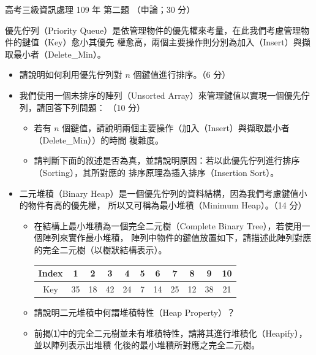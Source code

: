 \begin{pastexam}[label={px:gk3-109-ds-02}]{高考三級資訊處理 109 年 第二題}
（申論；30 分）

優先佇列（Priority Queue）是依管理物件的優先權來考量，在此我們考慮管理物件的鍵值（Key）愈小其優先
權愈高，兩個主要操作則分別為加入（Insert）與擷取最小者（Delete\_Min）。
\begin{itemize}[leftmargin=2em, labelsep=0.3em, itemsep=2pt]
\item[㈠] 請說明如何利用優先佇列對 $n$ 個鍵值進行排序。（6 分）
\item[㈡] 我們使用一個未排序的陣列（Unsorted Array）來管理鍵值以實現一個優先佇列，請回答下列問題：
（10 分）
\begin{itemize}[leftmargin=2em, labelsep=0.3em, itemsep=1pt]
\item[⑴] 若有 $n$ 個鍵值，請說明兩個主要操作（加入（Insert）與擷取最小者（Delete\_Min））的時間
複雜度。
\item[⑵] 請判斷下面的敘述是否為真，並請說明原因：若以此優先佇列進行排序（Sorting），其所對應的
排序原理為插入排序（Insertion Sort）。
\end{itemize}
\item[㈢] 二元堆積（Binary Heap）是一個優先佇列的資料結構，因為我們考慮鍵值小的物件有高的優先權，
所以又可稱為最小堆積（Minimum Heap）。（14 分）
\begin{itemize}[leftmargin=2em, labelsep=0.3em, itemsep=1pt]
\item[⑴] 在結構上最小堆積為一個完全二元樹（Complete Binary Tree），若使用一個陣列來實作最小堆積，
陣列中物件的鍵值放置如下，請描述此陣列對應的完全二元樹（以樹狀結構表示）。
\begin{center}
\begin{tabular}{|c|c|c|c|c|c|c|c|c|c|c|}
\hline
Index & 1 & 2 & 3 & 4 & 5 & 6 & 7 & 8 & 9 & 10 \\ \hline
Key & 35 & 18 & 42 & 24 & 7 & 14 & 25 & 12 & 38 & 21 \\ \hline
\end{tabular}
\end{center}
\item[⑵] 請說明二元堆積中何謂堆積特性（Heap Property）？
\item[⑶] 前揭⑴中的完全二元樹並未有堆積特性，請將其進行堆積化（Heapify），並以陣列表示出堆積
化後的最小堆積所對應之完全二元樹。
\end{itemize}
\end{itemize}
\end{pastexam}

